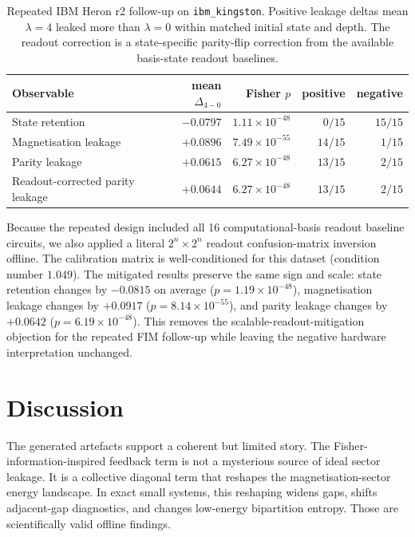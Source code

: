 \documentclass[preprint,aps,physrev,superscriptaddress,floatfix,longbibliography]{revtex4-2}
\begin{document}
\begin{table}[tb]
\centering
\small
\begin{tabular}{lrrrr}
\toprule
Observable & mean $\Delta_{4-0}$ & Fisher $p$ & positive & negative \\
\midrule
State retention & $-0.0797$ & $1.11\times10^{-48}$ & $0/15$ & $15/15$ \\
Magnetisation leakage & $+0.0896$ & $7.49\times10^{-55}$ & $14/15$ & $1/15$ \\
Parity leakage & $+0.0615$ & $6.27\times10^{-48}$ & $13/15$ & $2/15$ \\
Readout-corrected parity leakage & $+0.0644$ & $6.27\times10^{-48}$ & $13/15$ & $2/15$ \\
\bottomrule
\end{tabular}
\caption{Repeated IBM Heron r2 follow-up on \texttt{ibm\_kingston}. Positive
leakage deltas mean $\lambda=4$ leaked more than $\lambda=0$ within matched
initial state and depth. The readout correction is a state-specific parity-flip
correction from the available basis-state readout baselines.}
\label{tab:ibm}
\end{table}

Because the repeated design included all 16 computational-basis readout
baseline circuits, we also applied a literal $2^n\times 2^n$ readout
confusion-matrix inversion offline. The calibration matrix is well-conditioned
for this dataset (condition number $1.049$). The mitigated results preserve the
same sign and scale: state retention changes by $-0.0815$ on average
($p=1.19\times10^{-48}$), magnetisation leakage changes by $+0.0917$
($p=8.14\times10^{-55}$), and parity leakage changes by $+0.0642$
($p=6.19\times10^{-48}$). This removes the scalable-readout-mitigation
objection for the repeated FIM follow-up while leaving the negative hardware
interpretation unchanged.

\section{Discussion}

The generated artefacts support a coherent but limited story. The
Fisher-information-inspired feedback term is not a mysterious source of ideal
sector leakage. It is a collective diagonal term that reshapes the
magnetisation-sector energy landscape. In exact small systems, this reshaping
widens gaps, shifts adjacent-gap diagnostics, and changes low-energy
bipartition entropy. Those are scientifically valid offline findings.
\end{document}
